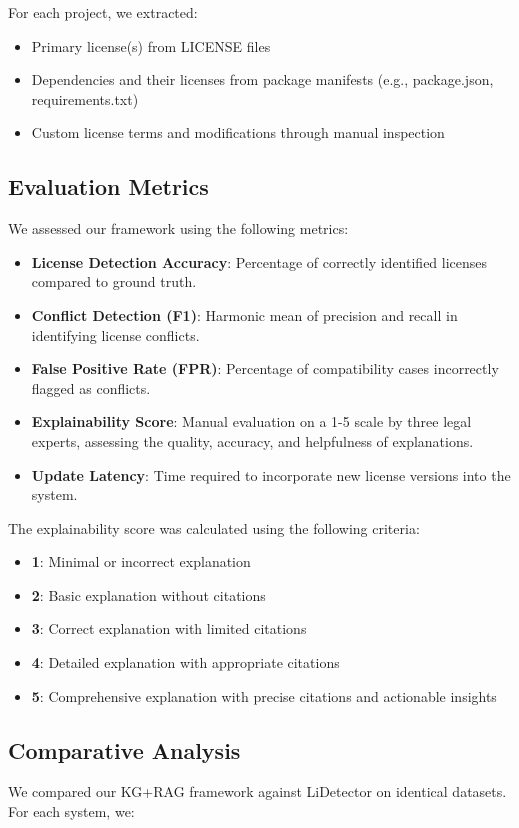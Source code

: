 \documentclass[9pt,twocolumn]{article}
\begin{document}
For each project, we extracted:
\begin{itemize}
    \item Primary license(s) from LICENSE files
    \item Dependencies and their licenses from package manifests (e.g., package.json, requirements.txt)
    \item Custom license terms and modifications through manual inspection
\end{itemize}

\subsection{Evaluation Metrics}
We assessed our framework using the following metrics:

\begin{itemize}
    \item \textbf{License Detection Accuracy}: Percentage of correctly identified licenses compared to ground truth.
    \item \textbf{Conflict Detection (F1)}: Harmonic mean of precision and recall in identifying license conflicts.
    \item \textbf{False Positive Rate (FPR)}: Percentage of compatibility cases incorrectly flagged as conflicts.
    \item \textbf{Explainability Score}: Manual evaluation on a 1-5 scale by three legal experts, assessing the quality, accuracy, and helpfulness of explanations.
    \item \textbf{Update Latency}: Time required to incorporate new license versions into the system.
\end{itemize}

The explainability score was calculated using the following criteria:
\begin{itemize}
    \item \textbf{1}: Minimal or incorrect explanation
    \item \textbf{2}: Basic explanation without citations
    \item \textbf{3}: Correct explanation with limited citations
    \item \textbf{4}: Detailed explanation with appropriate citations
    \item \textbf{5}: Comprehensive explanation with precise citations and actionable insights
\end{itemize}

\subsection{Comparative Analysis}
We compared our KG+RAG framework against LiDetector on identical datasets. For each system, we:
\end{document}

